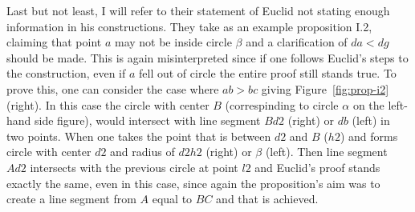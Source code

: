 \documentclass[]{interact}
\theoremstyle{plain}
\theoremstyle{definition}
\theoremstyle{remark}
\begin{document}
Last but not least, I will refer to their statement of Euclid not
stating enough information in his constructions. They take as an
example proposition I.2, claiming that point $a$ may not be inside
circle $\beta$ and a clarification of $da<dg$ should be made. This is
again misinterpreted since if one follows Euclid's steps to the
construction, even if $a$ fell out of circle the entire proof still
stands true. To prove this, one can consider the case where $ab>bc$
giving Figure~\ref{fig:prop-i2} (right). In this case the
circle with center $B$ (correspinding to circle $\alpha$ on the
left-hand side figure), would intersect with line
segment $Bd2$ (right) or $db$ (left) in two points.
When one takes the point that is between $d2$ and $B$ ($h2$) and
forms circle with center $d2$ and radius of $d2h2$ (right) or $\beta$ (left). 
Then line segment $Ad2$ intersects with the previous circle at point $l2$ and 
Euclid's proof stands exactly the same, even in this case, since again
the proposition's aim was to create a line segment from $A$ equal to
$BC$ and that is achieved.
\end{document}
